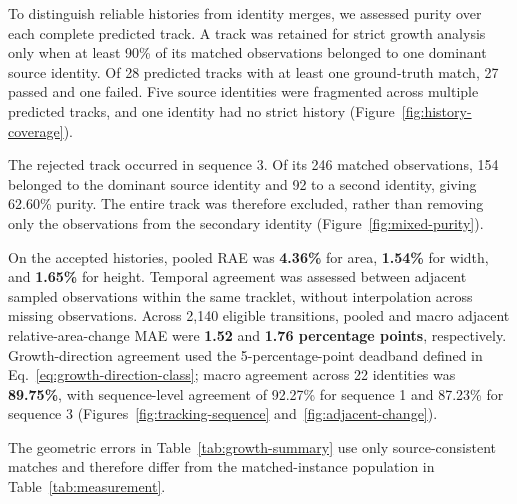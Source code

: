 \documentclass[11pt,a4paper]{article}
\begin{document}
To distinguish reliable histories from identity merges, we assessed purity over each complete predicted track. A track was retained for strict growth analysis only when at least 90\% of its matched observations belonged to one dominant source identity. Of 28 predicted tracks with at least one ground-truth match, 27 passed and one failed. Five source identities were fragmented across multiple predicted tracks, and one identity had no strict history (Figure~\ref{fig:history-coverage}).

The rejected track occurred in sequence 3. Of its 246 matched observations, 154 belonged to the dominant source identity and 92 to a second identity, giving 62.60\% purity. The entire track was therefore excluded, rather than removing only the observations from the secondary identity (Figure~\ref{fig:mixed-purity}).

On the accepted histories, pooled RAE was \textbf{4.36\%} for area, \textbf{1.54\%} for width, and \textbf{1.65\%} for height. Temporal agreement was assessed between adjacent sampled observations within the same tracklet, without interpolation across missing observations. Across 2,140 eligible transitions, pooled and macro adjacent relative-area-change MAE were \textbf{1.52} and \textbf{1.76 percentage points}, respectively. Growth-direction agreement used the 5-percentage-point deadband defined in Eq.~\ref{eq:growth-direction-class}; macro agreement across 22 identities was \textbf{89.75\%}, with sequence-level agreement of 92.27\% for sequence 1 and 87.23\% for sequence 3 (Figures~\ref{fig:tracking-sequence} and~\ref{fig:adjacent-change}).

The geometric errors in Table~\ref{tab:growth-summary} use only source-consistent matches and therefore differ from the matched-instance population in Table~\ref{tab:measurement}.
\end{document}
